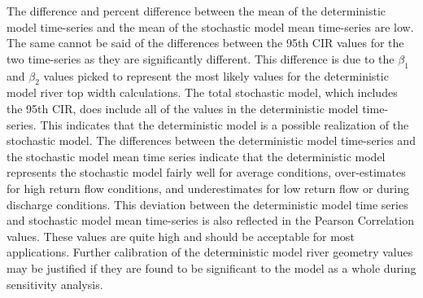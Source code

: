 \subtabletop
\begin{table}[htbp]
	\centering
	\caption[USR deterministic and stochastic model time-series total estimated unaccounted for non-point water gains and losses numeric results.]{USR deterministic and stochastic model time-series total estimated unaccounted for non-point water gains and losses numeric results.  Total daily contribution is presented in units of \si{\cubic\meter\per\second\per\kilo\meter} (\si{\cfs\per\mile}).}
	\label{tab:reachWater_US}
	
\end{table}
\tablevspace
\begin{table}[htbp]
	\centering
	\caption[DSR deterministic and stochastic model time-series total estimated unaccounted for non-point water gains and losses numeric results.]{DSR deterministic and stochastic model time-series total estimated unaccounted for non-point water gains and losses numeric results.  Total daily contribution is presented in units of \si{\cubic\meter\per\second\per\kilo\meter} (\si{\cfs\per\mile}).}
	\label{tab:reachWater_DS}
	
\end{table}

The difference and percent difference between the mean of the deterministic model time-series and the mean of the stochastic model mean time-series are low.  The same cannot be said of the differences between the 95th CIR values for the two time-series as they are significantly different.  This difference is due to the $ \beta_1 $ and $ \beta_2 $ values picked to represent the most likely values for the deterministic model river top width calculations.  The total stochastic model, which includes the 95th CIR, does include all of the values in the deterministic model time-series.  This indicates that the deterministic model is a possible realization of the stochastic model.  The differences between the deterministic model time-series and the stochastic model mean time series indicate that the deterministic model represents the stochastic model fairly well for average conditions, over-estimates for high return flow conditions, and underestimates for low return flow or during discharge conditions.  This deviation between the deterministic model time series and stochastic model mean time-series is also reflected in the Pearson Correlation values.  These values are quite high and should be acceptable for most applications.  Further calibration of the deterministic model river geometry values may be justified if they are found to be significant to the model as a whole during sensitivity analysis.

